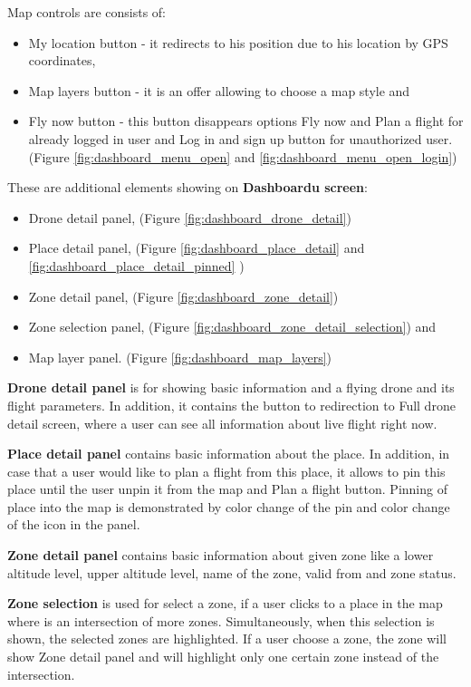 Map controls are consists of:
\begin{itemize}
    \item My location button - it redirects to his position due to his location by GPS coordinates,
    \item Map layers button - it is an offer allowing to choose a map style and
    \item Fly now button - this button disappears options Fly now and Plan a flight for already logged in user and Log in and sign up button for unauthorized user. (Figure \ref{fig:dashboard_menu_open} and \ref{fig:dashboard_menu_open_login})
\end{itemize}
These are additional elements showing on \textbf{Dashboardu screen}:
\begin{itemize}
    \item Drone detail panel, (Figure \ref{fig:dashboard_drone_detail})
    \item Place detail panel, (Figure \ref{fig:dashboard_place_detail} and \ref{fig:dashboard_place_detail_pinned} )
    \item Zone detail panel, (Figure \ref{fig:dashboard_zone_detail})
    \item Zone selection panel, (Figure \ref{fig:dashboard_zone_detail_selection}) and
    \item Map layer panel. (Figure \ref{fig:dashboard_map_layers})
\end{itemize}

\textbf{Drone detail panel} is for showing basic information and a flying drone and its flight parameters.
In addition, it contains the button to redirection to Full drone detail screen, where a user can see all information about live flight right now.

\textbf{Place detail panel} contains basic information about the place.
In addition, in case that a user would like to plan a flight from this place, it allows to pin this place until the user unpin it from the map and Plan a flight button.
Pinning of place into the map is demonstrated by color change of the pin and color change of the icon in the panel.

\textbf{Zone detail panel} contains basic information about given zone like a lower altitude level, upper altitude level, name of the zone, valid from and zone status.

\textbf{Zone selection} is used for select a zone, if a user clicks to a place in the map where is an intersection of more zones.
Simultaneously, when this selection is shown, the selected zones are highlighted.
If a user choose a zone, the zone will show Zone detail panel and will highlight only one certain zone instead of the intersection.

